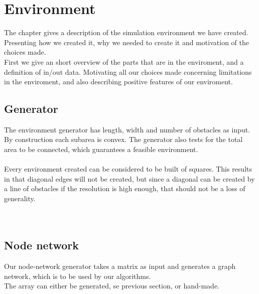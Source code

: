\chapter{Environment}
The chapter gives a description of the simulation environment we have created. Presenting how we created it, why we needed to create it and motivation of the choices made.\\

First we give an short overview of the parts that are in the enviroment, and a definition of in/out data. Motivating all our choices made concerning limitations in the enviroment, and also describing positive features of our enviroment.

\section{Generator}
The environment generator has length, width and number of obstacles as input. By construction each subarea is convex. The generator also tests for the total area to be connected, which guarantees a feasible environment.\\\\
Every environment created can be considered to be built of squares. This results in that diagonal edges will not be created, but since a diagonal can be created by a line of obstacles if the resolution is high enough, that should not be a loss of generality. \\\\
\\
\section{Node network}
Our node-network generator takes a matrix as input and generates a graph network, which is to be used by our algorithms.\\
The array can either be generated, se previous section, or hand-made.\\